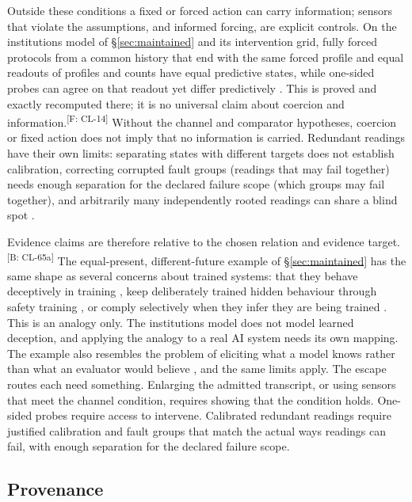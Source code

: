 \documentclass[pdflatex,sn-basic]{sn-jnl}%
\newcommand{\claim}[2]{\ifannotated\textsuperscript{\textcolor{blue!60!black}{\tiny[#1: #2]}}\fi}
\begin{document}
Outside these conditions a fixed or forced action can carry information; sensors that violate the assumptions, and informed forcing, are explicit controls. On the institutions model of \S\ref{sec:maintained} and its intervention grid, fully forced protocols from a common history that end with the same forced profile and equal readouts of profiles and counts have equal predictive states, while one-sided probes can agree on that readout yet differ predictively \citep{tsiokos2026institutions}. This is proved and exactly recomputed there; it is no universal claim about coercion and information.\claim{F}{CL-14} Without the channel and comparator hypotheses, coercion or fixed action does not imply that no information is carried. Redundant readings have their own limits: separating states with different targets does not establish calibration, correcting corrupted fault groups (readings that may fail together) needs enough separation for the declared failure scope (which groups may fail together), and arbitrarily many independently rooted readings can share a blind spot \citep{tsiokos2026v14}.

Evidence claims are therefore relative to the chosen relation and evidence target.\claim{B}{CL-65a} The equal-present, different-future example of \S\ref{sec:maintained} has the same shape as several concerns about trained systems: that they behave deceptively in training \citep{ngo2024,hubinger2019}, keep deliberately trained hidden behaviour through safety training \citep{hubinger2024}, or comply selectively when they infer they are being trained \citep{greenblatt2024faking}. This is an analogy only. The institutions model does not model learned deception, and applying the analogy to a real AI system needs its own mapping. The example also resembles the problem of eliciting what a model knows rather than what an evaluator would believe \citep{christiano2021elk}, and the same limits apply. The escape routes each need something. Enlarging the admitted transcript, or using sensors that meet the channel condition, requires showing that the condition holds. One-sided probes require access to intervene. Calibrated redundant readings require justified calibration and fault groups that match the actual ways readings can fail, with enough separation for the declared failure scope.

\subsection{Provenance}\label{sec:provenance}
\end{document}
